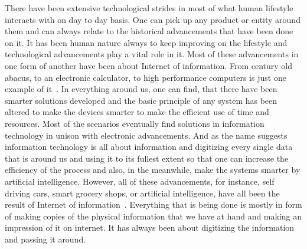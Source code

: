 There have been extensive technological strides in most of what human
lifestyle interacts with on day to day basis. One can pick up any
product or entity around them and can always relate to the historical
advancements that have been done on it. It has been human nature
always to keep improving on the lifestyle and technological
advancements play a vital role in it. Most of these advancements in
one form of another have been about Internet of information. From
century old abacus, to an electronic calculator, to high performance
computers is just one example of it~\cite{tapscott1}. In everything
around us, one can find, that there have been smarter solutions
developed and the basic principle of any system has been altered to
make the devices smarter to make the efficient use of time and
resources. Most of the scenarios eventually find solutions in
information technology in unison with electronic advancements. And as
the name suggests information technology is all about information and
digitizing every single data that is around us and using it to its
fullest extent so that one can increase the efficiency of the process
and also, in the meanwhile, make the systems smarter by artificial
intelligence. However, all of these advancements, for instance, self
driving cars, smart grocery shops, or artificial intelligence, have
all been the result of Internet of information~\cite{tapscott1}.
Everything that is being done is mostly in form of making copies of
the physical information that we have at hand and making an impression
of it on internet. It has always been about digitizing the information
and passing it around.

